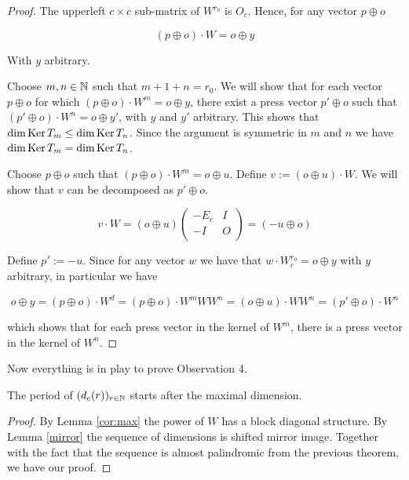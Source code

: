 \begin{proof}
  The upperleft $c\times c$ sub-matrix of $W^{r_{0}}$ is $O_{c}$. Hence, for any vector $p\oplus o$

  \[
    (p\oplus o)\cdot W = o\oplus y
  \]

  With $y$ arbitrary.

  Choose $m,n\in\mathbb{N}$ such that $m + 1 + n = r_{0}$. We will show that for each vector $p\oplus o$ for which $(p\oplus o)\cdot W^m = o\oplus y$, there exist a press vector $p'\oplus o$ such that $(p'\oplus o)\cdot W^n = o\oplus y'$, with $y$ and $y'$ arbitrary.
  This shows that $\dim\operatorname{Ker} T_{m} \leq \dim\operatorname{Ker} T_{n}$. Since the argument is symmetric in $m$ and $n$ we have $\dim\operatorname{Ker} T_{m} = \dim\operatorname{Ker} T_{n}$.

	Choose $p\oplus o$ such that $(p\oplus o)\cdot W^{m} = o\oplus u$. Define $v := (o\oplus u)\cdot W$. We will show that $v$ can be decomposed as $p'\oplus o$.

  \[
    v\cdot W = (o\oplus u)\left(
    \begin{array}{cc}
      -E_{c} & I \\
      -I    & O \\
    \end{array}
    \right)
    =(-u\oplus o)
  \]
  
  Define $p' := -u$. Since for any vector $w$ we have that $w\cdot W_{c}^{r_0} = o\oplus y$ with $y$ arbitrary, in particular we have

  \[
  o\oplus y = (p\oplus o)\cdot W^{d} = (p\oplus o)\cdot W^{m} W W^{n} = (o\oplus u)\cdot W W^{n} = (p'\oplus o)\cdot W^{n}
  \]

  which shows that for each press vector in the kernel of $W^{m}$, there is a press vector in the kernel of $W^{n}$.
\end{proof}

Now everything is in play to prove Observation 4.

\begin{theorem}[Observation 4]
	The period of $(d_{c}(r))_{r\in\mathbb{N}}$ starts after the maximal dimension.
\end{theorem}

\begin{proof}
By Lemma \ref{cor:max} the power of $W$ has a block diagonal structure. By Lemma \ref{mirror} the sequence of dimensions
is shifted mirror image. Together with the fact that the sequence is almost palindromic from the previous theorem, we have our proof.
\end{proof}
